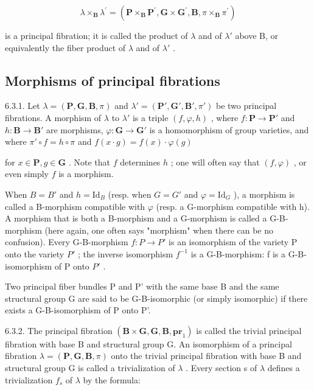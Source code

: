 \[
\lambda \times_ {\mathbf {B}} \lambda^ {\prime} = (\mathbf {P} \times_ {\mathbf {B}} \mathbf {P} ^ {\prime}, \mathbf {G} \times \mathbf {G} ^ {\prime}, \mathbf {B}, \pi \times_ {\mathbf {B}} \pi^ {\prime})
\]

is a principal fibration; it is called the product of \(\lambda\) and of \(\lambda'\) above B, or equivalently the fiber product of \(\lambda\) and of \(\lambda'\) .

\subsection{Morphisms of principal fibrations}

6.3.1. Let \(\lambda = (\mathbf{P}, \mathbf{G}, \mathbf{B}, \pi)\) and \(\lambda' = (\mathbf{P}', \mathbf{G}', \mathbf{B}', \pi')\) be two principal fibrations. A morphism of \(\lambda\) to \(\lambda'\) is a triple \((f, \varphi, h)\) , where \(f: \mathbf{P} \to \mathbf{P}'\) and \(h: \mathbf{B} \to \mathbf{B}'\) are morphisms, \(\varphi: \mathbf{G} \to \mathbf{G}'\) is a homomorphism of group varieties, and where \(\pi' \circ f = h \circ \pi\) and \(f(x \cdot g) = f(x) \cdot \varphi(g)\)

for \(x \in \mathbf{P}, g \in \mathbf{G}\) . Note that \(f\) determines \(h\) ; one will often say that \((f, \varphi)\) , or even simply \(f\) is a morphism.

When \(B = B'\) and \(h = \mathrm{Id}_{B}\) (resp. when \(G = G'\) and \(\varphi = \mathrm{Id}_{G}\) ), a morphism is called a B-morphism compatible with \(\varphi\) (resp. a G-morphism compatible with h). A morphism that is both a B-morphism and a G-morphism is called a G-B-morphism (here again, one often says "morphism" when there can be no confusion). Every G-B-morphism \(f : P \to P'\) is an isomorphism of the variety P onto the variety \(P'\) ; the inverse isomorphism \(f^{-1}\) is a G-B-morphism: f is a G-B-isomorphism of P onto \(P'\) .

Two principal fiber bundles P and P' with the same base B and the same structural group G are said to be G-B-isomorphic (or simply isomorphic) if there exists a G-B-isomorphism of P onto P'.

6.3.2. The principal fibration \((\mathbf{B} \times \mathbf{G}, \mathbf{G}, \mathbf{B}, \mathbf{pr}_{1})\) is called the trivial principal fibration with base B and structural group G. An isomorphism of a principal fibration \(\lambda = (\mathbf{P}, \mathbf{G}, \mathbf{B}, \pi)\) onto the trivial principal fibration with base B and structural group G is called a trivialization of \(\lambda\) . Every section s of \(\lambda\) defines a trivialization \(f_{s}\) of \(\lambda\) by the formula:

